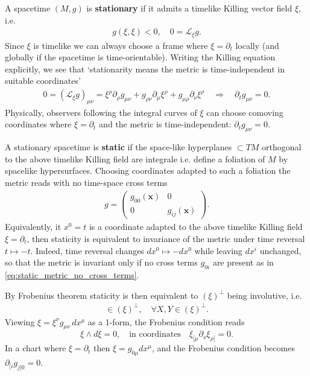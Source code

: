 \documentclass[../geometry_main.tex]{subfiles}
\begin{document}
\begin{mytheorem}
%
A spacetime $(M,g)$ is \textbf{stationary} if it admits a timelike Killing vector field $\xi$, i.e.
\begin{align}
    g(\xi,\xi) < 0, \quad 0= \mathcal{L}_\xi g.
\end{align}
%
Since $\xi$ is timelike we can always choose a frame where $\xi=\partial_t$ locally (and globally if the spacetime is time-orientable).
Writing the Killing equation explicitly, we see that `stationarity means the metric is time-independent in suitable coordinates'
\begin{align}
    0=\left(\mathcal{L}_\xi g\right)_{\mu\nu} = \xi^\rho \partial_\rho g_{\mu\nu} + g_{\rho\nu} \partial_\mu \xi^\rho + g_{\mu\rho} \partial_\nu \xi^\rho \quad \Rightarrow \quad \partial_t g_{\mu\nu} = 0.
\end{align}
%
Physically, observers following the integral curves of $\xi$ can choose comoving coordinates where $\xi=\partial_t$ and the metric is time-independent: $\partial_t g_{\mu\nu}=0$.

A stationary spacetime is \textbf{static} if the space-like hyperplanes $\subset T M$ orthogonal to the above timelike Killing field are integrale i.e. define a foliation of $M$ by spacelike hypersurfaces.
Choosing coordinates adapted to such a foliation the metric reads with no time-space cross terms
\begin{align}\label{eq:static_metric_no_cross_terms}
    g = \begin{pmatrix}
    g_{00}(\mathbf{x}) & 0 \\
    0 & g_{ij}(\mathbf{x})
    \end{pmatrix}.
\end{align}
%
Equivalently, it $x^0=t$ is a coordinate adapted to the above timelike Killing field $\xi=\partial_t$, then staticity is equivalent to invariance of the metric under time reversal $t\mapsto -t$.
Indeed, time reversal changes $dx^0 \mapsto -dx^0$ while leaving $dx^i$ unchanged, so that the metric is invariant only if no cross terms $g_{0i}$ are present as in \eqref{eq:static_metric_no_cross_terms}.

By Frobenius theorem staticity is then equivalent to $(\xi)^\perp$ being involutive, i.e.
\begin{align}
   [X,Y]\in \left(\xi\right)^\perp, \quad \forall X,Y \in \left(\xi\right)^\perp.
\end{align}
Viewing $\xi=\xi^\nu g_{\mu\nu}\, dx^\mu$ as a 1-form, the Frobenius condition reads              
\begin{equation}
    \xi \wedge d\xi = 0, \quad \text{in coordinates} \quad \xi_{[\mu} \partial_\nu \xi_{\rho]} = 0.
\end{equation}
In a chart where $\xi=\partial_t$ then $\xi = g_{0 \mu}dx^\mu$, and the Frobenius condition becomes $\partial_{[i} g_{j]0}=0$.


\end{mytheorem}
\end{document}
